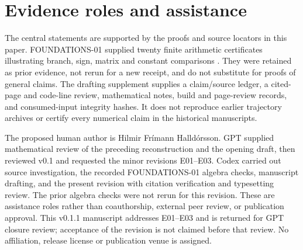 \documentclass[11pt,a4paper]{article}
\theoremstyle{definition}
\numberwithin{equation}{section}
\begin{document}
\section{Evidence roles and assistance}
\label{app:evidence}

The central statements are supported by the proofs and source locators
in this paper. FOUNDATIONS-01 supplied twenty finite arithmetic
certificates illustrating branch, sign, matrix and constant comparisons
\cite{F01,Branch}. They were retained as prior evidence, not rerun for
a new receipt, and do not substitute for proofs of general claims.
The drafting supplement supplies a claim/source ledger, a cited-page
and code-line review, mathematical notes, build and page-review records,
and consumed-input integrity hashes. It does not reproduce earlier
trajectory archives or certify every numerical claim in the historical
manuscripts.

The proposed human author is Hilmir Fr\'imann Halld\'orsson.
GPT supplied mathematical review of the preceding reconstruction and the
opening draft, then reviewed v0.1 and requested the minor revisions
E01--E03. Codex carried out source investigation, the recorded
FOUNDATIONS-01 algebra checks, manuscript drafting, and the present
revision with citation verification and typesetting review. The prior
algebra checks were not rerun for this revision.
These are assistance roles rather than coauthorship, external peer review,
or publication approval. This v0.1.1 manuscript addresses E01--E03 and is
returned for GPT closure review; acceptance of the revision is not
claimed before that review.
No affiliation, release license or publication venue is assigned.
\end{document}
